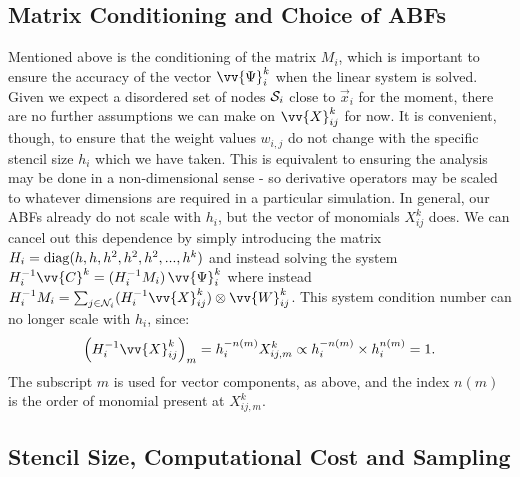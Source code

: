 \subsection{Matrix Conditioning and Choice of ABFs}


Mentioned above is the conditioning of the matrix $M_i$, which is important to ensure the accuracy of the vector $\vv{\Psi}^k_i$ when the linear system is solved. Given we expect a disordered set of nodes $\cl{S}_i$ close to $\vec{x}_i$ for the moment, there are no further assumptions we can make on $\vv{X}^k_{ij}$ for now. It is convenient, though, to ensure that the weight values $w_{i ,j}$ do not change with the specific stencil size $h_i$ which we have taken. This is equivalent to ensuring the analysis may be done in a non-dimensional sense - so derivative operators may be scaled to whatever dimensions are required in a particular simulation. In general, our ABFs already do not scale with $h_i$, but the vector of monomials $X^k_{ij}$ does. We can cancel out this dependence by simply introducing the matrix $H_i = \rm{diag}(h, h, h^2, h^2, h^2, ..., h^k)$ and instead solving the system $H_i^{-1} \vv{C}^k = (H_i^{-1} M_i) \, \vv{\Psi}^k_i$ where instead $H_i^{-1} M_i = \sum_{j \in \cl{N}_i} (H_i^{-1} \vv{X}^k_{ij}) \otimes \vv{W}^k_{ij}$. This system condition number can no longer scale with $h_i$, since:
\begin{equation}
\left( H_i^{-1} \vv{X}^k_{ij} \right)_m
= h_i^{-n(m)} X^k_{ij, m}
\propto h_i^{-n(m)} \times h_i^{n(m)} = 1.
\end{equation}
The subscript $m$ is used for vector components, as above, and the index $n(m)$ is the order of monomial present at $X^k_{ij, m}$.




\subsection{Stencil Size, Computational Cost and Sampling}

